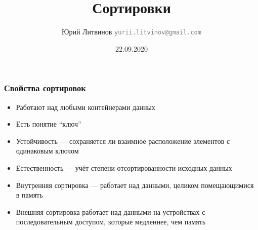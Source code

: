 \documentclass[xetex,mathserif,serif]{beamer}
\title{Сортировки}
\author[Юрий Литвинов]{Юрий Литвинов \newline \textcolor{gray}{\small\texttt{yurii.litvinov@gmail.com}}}
\date{22.09.2020}
\begin{document}
	
	\frame{\titlepage}
	
	\begin{frame}
		\frametitle{Свойства сортировок}
		\begin{itemize}
			\item Работают над любыми контейнерами данных
			\item Есть понятие ``ключ''
			\item Устойчивость --- сохраняется ли взаимное расположение элементов с одинаковым ключом
			\item Естественность --- учёт степени отсортированности исходных данных
			\item Внутренняя сортировка --- работает над данными, целиком помещающимися в память
			\item Внешняя сортировка работает над данными на устройствах с последовательным доступом, которые медленнее, чем память
		\end{itemize}
	\end{frame}
\end{document}
